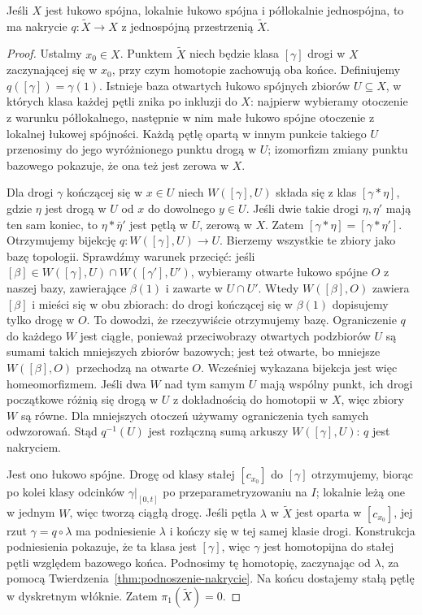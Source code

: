 \begin{twierdzenie}
\label{thm:uniwersalne-nakrycie}
Jeśli $X$ jest łukowo spójna, lokalnie
łukowo spójna i półlokalnie jednospójna,
to ma nakrycie $q:\widetilde X\to X$
z jednospójną przestrzenią $\widetilde X$.
\end{twierdzenie}
\begin{proof}
Ustalmy $x_0\in X$. Punktem $\widetilde X$
niech będzie klasa $[\gamma]$ drogi w $X$
zaczynającej się w $x_0$, przy czym
homotopie zachowują oba końce.
Definiujemy $q([\gamma])=\gamma(1)$.
Istnieje baza otwartych łukowo spójnych
zbiorów $U\subseteq X$, w których
klasa każdej pętli znika po inkluzji do $X$:
najpierw wybieramy otoczenie z warunku
półlokalnego, następnie w nim małe
łukowo spójne otoczenie z lokalnej
łukowej spójności. Każdą pętlę opartą w innym punkcie
takiego $U$ przenosimy do jego wyróżnionego punktu drogą w $U$;
izomorfizm zmiany punktu bazowego pokazuje, że ona też jest zerowa w $X$.

Dla drogi $\gamma$ kończącej się w $x\in U$
niech $W([\gamma],U)$ składa się z klas
$[\gamma*\eta]$, gdzie $\eta$ jest drogą
w $U$ od $x$ do dowolnego $y\in U$.
Jeśli dwie takie drogi $\eta,\eta'$
mają ten sam koniec, to
$\eta*\bar\eta'$ jest pętlą w $U$,
zerową w $X$. Zatem $[\gamma*\eta]
=[\gamma*\eta']$. Otrzymujemy bijekcję
$q:W([\gamma],U)\to U$. Bierzemy wszystkie
te zbiory jako bazę topologii. Sprawdźmy warunek przecięć:
jeśli $[\beta]\in W([\gamma],U)\cap W([\gamma'],U')$,
wybieramy otwarte łukowo spójne $O$ z naszej bazy,
zawierające $\beta(1)$ i zawarte w $U\cap U'$.
Wtedy $W([\beta],O)$ zawiera $[\beta]$ i mieści się w obu zbiorach:
do drogi kończącej się w $\beta(1)$ dopisujemy tylko drogę w $O$.
To dowodzi, że rzeczywiście otrzymujemy bazę.
Ograniczenie $q$ do każdego $W$ jest ciągłe, ponieważ przeciwobrazy
otwartych podzbiorów $U$ są sumami takich mniejszych zbiorów bazowych;
jest też otwarte, bo mniejsze $W([\beta],O)$ przechodzą na otwarte $O$.
Wcześniej wykazana bijekcja jest więc homeomorfizmem.
Jeśli dwa $W$ nad tym samym
$U$ mają wspólny punkt, ich drogi początkowe
różnią się drogą w $U$ z dokładnością
do homotopii w $X$, więc zbiory $W$
są równe. Dla mniejszych otoczeń
używamy ograniczenia tych samych odwzorowań.
Stąd $q^{-1}(U)$ jest rozłączną sumą
arkuszy $W([\gamma],U)$: $q$ jest nakryciem.

Jest ono łukowo spójne. Drogę od klasy
stałej $[c_{x_0}]$ do $[\gamma]$
otrzymujemy, biorąc po kolei klasy
odcinków $\gamma|_{[0,t]}$ po
przeparametryzowaniu na $I$; lokalnie
leżą one w jednym $W$, więc tworzą
ciągłą drogę. Jeśli pętla
$\lambda$ w $\widetilde X$ jest oparta
w $[c_{x_0}]$, jej rzut $\gamma=q\circ\lambda$
ma podniesienie $\lambda$ i kończy
się w tej samej klasie drogi.
Konstrukcja podniesienia pokazuje,
że ta klasa jest $[\gamma]$, więc
$\gamma$ jest homotopijna do stałej
pętli względem bazowego końca.
Podnosimy tę homotopię, zaczynając
od $\lambda$, za pomocą
Twierdzenia~\ref{thm:podnoszenie-nakrycie}.
Na końcu dostajemy stałą pętlę
w dyskretnym włóknie. Zatem
$\pi_1(\widetilde X)=0$.
\end{proof}

